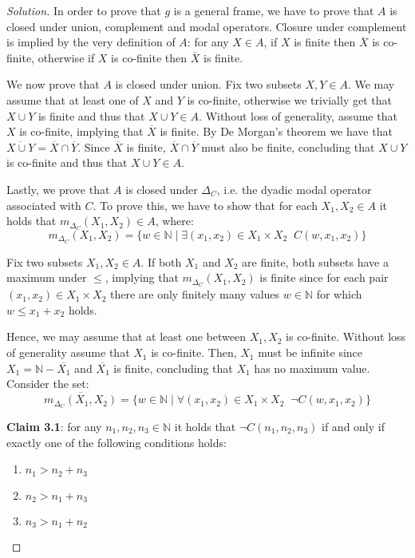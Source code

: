 \documentclass[12pt,a4paper]{report}
\theoremstyle{definition}
\newcommand{\N}{\mathbb{N}}                     %
\begin{document}
    \begin{proof}[Solution]
        In order to prove that $g$ is a general frame, we have to prove that $A$ is closed under union, complement and modal operators. Closure under complement is implied by the very definition of $A$: for any $X \in A$, if $X$ is finite then $\overline{X}$ is co-finite, otherwise if $X$ is co-finite then $\overline{X}$ is finite.
        
        We now prove that $A$ is closed under union. Fix two subsets $X,Y \in A$. We may assume that at least one of $X$ and $Y$ is co-finite, otherwise we trivially get that $X \cup Y$ is finite and thus that $X \cup Y \in A$. Without loss of generality, assume that $X$ is co-finite, implying that $\overline{X}$ is finite. By De Morgan's theorem we have that $\overline{X \cup Y} = \overline{X} \cap \overline{Y}$. Since $\overline{X}$ is finite, $\overline{X} \cap \overline{Y}$ must also be finite, concluding that $X \cup Y$ is co-finite and thus that $X \cup Y \in A$.

        Lastly, we prove that $A$ is closed under $\Delta_{C}$, i.e. the dyadic modal operator associated with $C$. To prove this, we have to show that for each $X_1,X_2 \in A$ it holds that $m_{\Delta_{C}}(X_1, X_2) \in A$, where:
        \[m_{\Delta_{C}}(X_1, X_2) = \{w \in \N \mid \exists (x_1,x_2) \in X_1 \times X_2 \;\; C(w,x_1,x_2)\}\]

        Fix two subsets $X_1,X_2 \in A$. If both $X_1$ and $X_2$ are finite, both subsets have a maximum under $\leq$, implying that $m_{\Delta_{C}}(X_1, X_2)$ is finite since for each pair $(x_1,x_2) \in X_1 \times X_2$ there are only finitely many values $w \in \N$ for which $w \leq x_1+x_2$ holds.

        Hence, we may assume that at least one between $X_1, X_2$ is co-finite. Without loss of generality assume that $X_1$ is co-finite. Then, $X_1$ must be infinite since $X_1 = \N - \overline{X_1}$ and $\overline{X_1}$ is finite, concluding that $X_1$ has no maximum value. Consider the set:
        \[\overline{m_{\Delta_{C}}(X_1, X_2)} = \{w \in \N \mid \forall (x_1,x_2) \in X_1 \times X_2 \;\; \lnot C(w,x_1,x_2)\}\]

        \textbf{Claim 3.1}: for any $n_1, n_2, n_3 \in \N$ it holds that $\lnot C(n_1, n_2, n_3)$ if and only if exactly one of the following conditions holds:
        \begin{enumerate}
            \item $n_1 > n_2 + n_3$
            \item $n_2 > n_1 + n_3$
            \item $n_3 > n_1 + n_2$
        \end{enumerate}


\end{proof}
\end{document}
